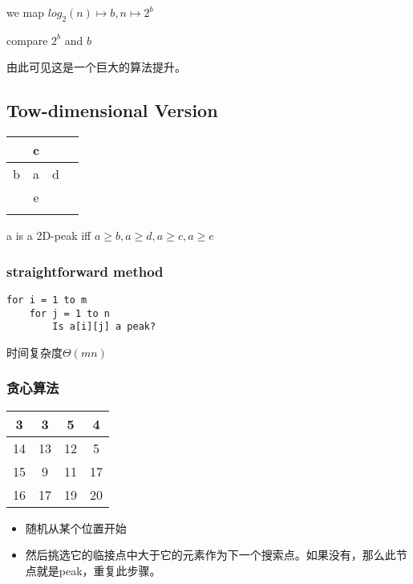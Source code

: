 \documentclass[11pt]{article}
\begin{document}
\begin{CJK}{UTF8}{gbsn}
\begin{itemize}
  we map $log_2(n)\mapsto b, n\mapsto 2^b$

  compare $2^b$ and $b$
\end{itemize}

由此可见这是一个巨大的算法提升。

\subsection{Tow-dimensional Version}

\begin{center}
  \begin{tabular}{|c|c|c|c|}
    \hline
     & c & &  \\\hline
    b & a & d & \\\hline
    & e & & \\\hline
    & & & \\
    \hline
  \end{tabular}
\end{center}

a is a 2D-peak iff $a \geq b, a \geq d, a \geq c, a \geq e$

\subsubsection{straightforward method}

\begin{verbatim}
for i = 1 to m
    for j = 1 to n
        Is a[i][j] a peak?
\end{verbatim}

时间复杂度$\Theta(mn)$

\subsubsection{贪心算法}

\begin{center}
  \begin{tabular}{|c|c|c|c|}
    \hline
    3 & 3 & 5 & 4 \\\hline
    14 & 13 & 12 & 5 \\\hline
    15 & 9 & 11 & 17 \\\hline
    16 & 17 & 19 & 20 \\
    \hline
  \end{tabular}
\end{center}

\begin{itemize}
\item 随机从某个位置开始
\item 然后挑选它的临接点中大于它的元素作为下一个搜索点。如果没有，那么此节点就是peak，重复此步骤。
\end{itemize}


\end{CJK}
\end{document}
